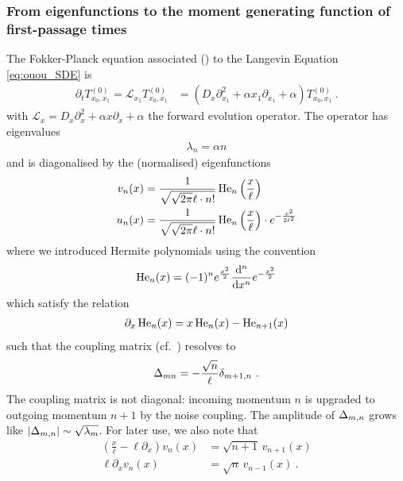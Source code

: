 \documentclass[%
 reprint,
superscriptaddress,
nofootinbib,
 amsmath,amssymb,
 aps,
prx,
]{revtex4-2}
\begin{document}
\subsubsection{From eigenfunctions to the moment generating function of first-passage times\label{subsec:OUOU_eigenfunctions}}
The Fokker-Planck equation associated (\cf {}) to the Langevin Equation  \eqref{eq:ouou_SDE} 
is
\begin{align}
\partial_t T^{(0)}_{x_0,x_1} = 
\mathcal{L}_{x_1}T^{(0)}_{x_0,x_1} &= \left( D_x\partial_{x_1}^2+ \alpha x_1 \partial_{x_1} + \alpha  \right)  T^{(0)}_{x_0,x_1}~.
\end{align}
with $\mathcal{L}_x =  D_x\partial_{x}^2+ \alpha x \partial_{x} + \alpha  $ the forward evolution operator.
The operator has eigenvalues \cite{pavliotis2014}
\begin{align}
	\lambda_n = \alpha n
\end{align}
and is diagonalised by the (normalised) eigenfunctions
\begin{align}
	v_n(x) & = \frac{1}{\sqrt{\sqrt{2 \pi}\ell \cdot n!}} \operatorname{He}_n\left( \frac{x}{\ell} \right)\\
	u_n(x) & = \frac{1}{\sqrt{\sqrt{2 \pi}\ell \cdot n!}} \operatorname{He}_n\left( \frac{x}{\ell} \right)\cdot e^{ -\frac{x^2}{2 \ell^2}}
	\label{}
\end{align}
where we introduced Hermite polynomials using the convention
\begin{align}
	\operatorname{He}_n(x) = (-1)^n e^{\frac{{x}^2}{2}} \frac{\mathrm{d}^n}{\mathrm{d} x^n} e^{-\frac{{x}^2}{2}} 
	\label{}
\end{align}
which satisfy the relation
\begin{align}
	\partial_{x}\operatorname{He}_n(x) = x\operatorname{He}_n(x) - \operatorname{He}_{n+1}(x)
	\label{}
\end{align}
such that the coupling matrix (cf.~) resolves to
\begin{align}
	\Delta_{mn} = -\frac{\sqrt{n}}{ \ell}\delta_{m+1, n}~.
	\label{eq:ou_derivative_coupling}
\end{align}
The coupling matrix is not diagonal: incoming momentum $n$ is upgraded to outgoing momentum $n+1$ by the noise coupling. The amplitude of $\Delta_{m,n}$ grows like $|\Delta_{m,n}| \sim \sqrt{\lambda_m }$. For later use, we also note that
\begin{align}
	\left(\frac{x}{\ell} -\ell  \partial_x\right) v_n(x) &= \sqrt{n+1} \, v_{n+1}(x)  \label{eq:v_creation}\\
	\ell \partial_x v_n(x) &= \sqrt{n} \, v_{n-1}(x)~.
	\label{eq:v_annihilation}
\end{align}
\end{document}
